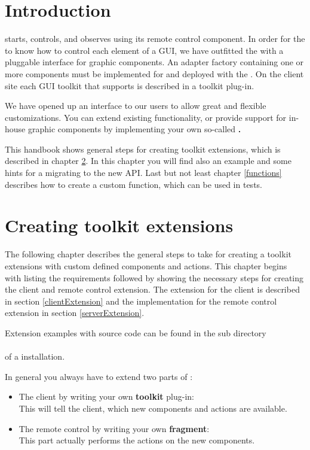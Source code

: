 \chapter{Introduction}
\label{introduction}

\app{} starts, controls, and observes \gdauts using its remote control component. In
order for the \gdagent to know how to control each element of a GUI, we have
outfitted the \gdagent with a pluggable interface for graphic components. An
adapter factory containing one or more components must be implemented for and
deployed with the \gdaut. On the client site each GUI toolkit that \app{}
supports is described in a toolkit plug-in.

We have opened up an interface to our users to allow great and flexible
customizations. You can extend existing functionality, or provide support for
in-house graphic components by implementing your own so-called
\textbf{\gdtesterclasses.}

This handbook shows general steps for creating \app{} toolkit extensions, which
is described in chapter \ref{toolkitExtension}. In this chapter you will find
also an example and some hints for a migrating to the new API. Last but not
least chapter \ref{functions} describes how to create a custom \app{} function,
which can be used in \app{} tests.

\chapter{Creating \app{} toolkit extensions}
\label{toolkitExtension}

The following chapter describes the general steps to take for creating a \app{}
toolkit extensions with custom defined components and actions. This chapter
begins with listing the requirements followed by showing the necessary steps
for creating the \app{} client and remote control extension. The extension for the
\app{} client is described in section \ref{clientExtension} and the
implementation for the \app{} remote control extension in section \ref{serverExtension}.

Extension examples with source code can
be found in the sub directory\\
\\
of a \app{} installation.

In general you always have to extend two parts of \app{}:
\begin{itemize}
\item The \app{} client by writing your own \textbf{toolkit} plug-in:\\
      This will tell the client, which new components and actions are available.
\item The \app{} remote control by writing your own \textbf{fragment}:\\
      This part actually performs the actions on the new components.
\end{itemize}

